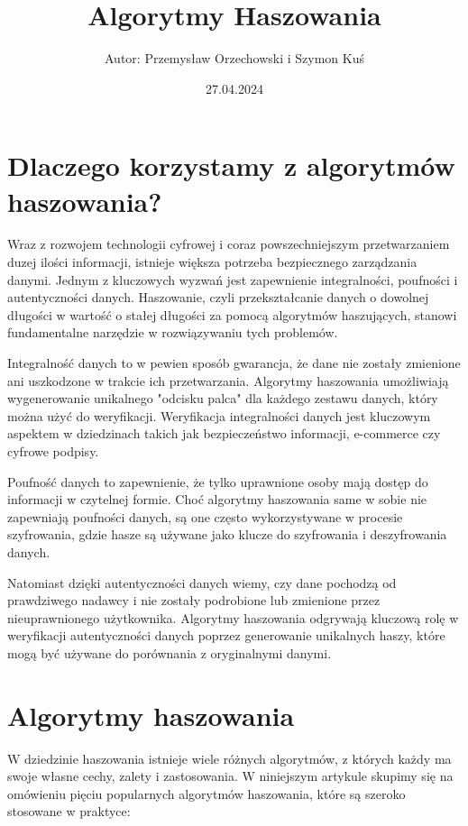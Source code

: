 \documentclass{article}
\title{Algorytmy Haszowania}
\author{Autor: {Przemysław Orzechowski i Szymon Kuś}}
\date{27.04.2024}
\begin{document}
\maketitle

\section{Dlaczego korzystamy z algorytmów haszowania?}
    Wraz z rozwojem technologii cyfrowej i coraz powszechniejszym przetwarzaniem duzej ilości informacji, istnieje większa potrzeba bezpiecznego zarządzania danymi. Jednym z kluczowych wyzwań jest zapewnienie integralności, poufności i autentyczności danych. Haszowanie, czyli przekształcanie danych o dowolnej długości w wartość o stałej długości za pomocą algorytmów haszujących, stanowi fundamentalne narzędzie w rozwiązywaniu tych problemów.

    Integralność danych to w pewien sposób gwarancja, że dane nie zostały zmienione ani uszkodzone w trakcie ich przetwarzania. Algorytmy haszowania umożliwiają wygenerowanie unikalnego "odcisku palca" dla każdego zestawu danych, który można użyć do weryfikacji. Weryfikacja integralności danych jest kluczowym aspektem w dziedzinach takich jak bezpieczeństwo informacji, e-commerce czy cyfrowe podpisy.

    Poufność danych to zapewnienie, że tylko uprawnione osoby mają dostęp do informacji w czytelnej formie. Choć algorytmy haszowania same w sobie nie zapewniają poufności danych, są one często wykorzystywane w procesie szyfrowania, gdzie hasze są używane jako klucze do szyfrowania i deszyfrowania danych.

    Natomiast dzięki autentyczności danych wiemy, czy dane pochodzą od prawdziwego nadawcy i nie zostały podrobione lub zmienione przez nieuprawnionego użytkownika. Algorytmy haszowania odgrywają kluczową rolę w weryfikacji autentyczności danych poprzez generowanie unikalnych haszy, które mogą być używane do porównania z oryginalnymi danymi.

\section{Algorytmy haszowania}
    W dziedzinie haszowania istnieje wiele różnych algorytmów, z których każdy ma swoje własne cechy, zalety i zastosowania. W niniejszym artykule skupimy się na omówieniu pięciu popularnych algorytmów haszowania, które są szeroko stosowane w praktyce:
\end{document}
